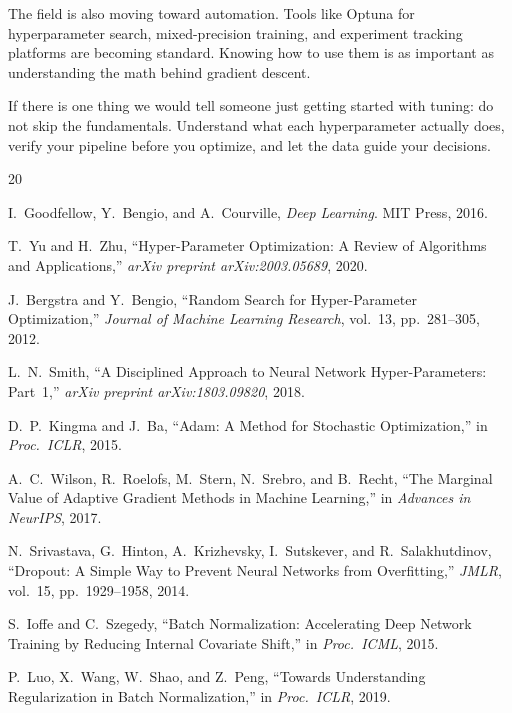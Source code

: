 \documentclass[12pt, letterpaper]{article}
\begin{document}
The field is also moving toward automation. Tools like Optuna for hyperparameter search, mixed-precision training, and experiment tracking platforms are becoming standard. Knowing how to use them is as important as understanding the math behind gradient descent.

If there is one thing we would tell someone just getting started with tuning: do not skip the fundamentals. Understand what each hyperparameter actually does, verify your pipeline before you optimize, and let the data guide your decisions.

\newpage
\begin{thebibliography}{20}

I.\ Goodfellow, Y.\ Bengio, and A.\ Courville,
\textit{Deep Learning}.
MIT Press, 2016.

T.\ Yu and H.\ Zhu,
``Hyper-Parameter Optimization: A Review of Algorithms and Applications,''
\textit{arXiv preprint arXiv:2003.05689}, 2020.

J.\ Bergstra and Y.\ Bengio,
``Random Search for Hyper-Parameter Optimization,''
\textit{Journal of Machine Learning Research}, vol.~13, pp.~281--305, 2012.

L.~N.\ Smith,
``A Disciplined Approach to Neural Network Hyper-Parameters: Part~1,''
\textit{arXiv preprint arXiv:1803.09820}, 2018.

D.~P.\ Kingma and J.\ Ba,
``Adam: A Method for Stochastic Optimization,''
in \textit{Proc.\ ICLR}, 2015.

A.~C.\ Wilson, R.\ Roelofs, M.\ Stern, N.\ Srebro, and B.\ Recht,
``The Marginal Value of Adaptive Gradient Methods in Machine Learning,''
in \textit{Advances in NeurIPS}, 2017.

N.\ Srivastava, G.\ Hinton, A.\ Krizhevsky, I.\ Sutskever, and R.\ Salakhutdinov,
``Dropout: A Simple Way to Prevent Neural Networks from Overfitting,''
\textit{JMLR}, vol.~15, pp.~1929--1958, 2014.

S.\ Ioffe and C.\ Szegedy,
``Batch Normalization: Accelerating Deep Network Training by Reducing Internal Covariate Shift,''
in \textit{Proc.\ ICML}, 2015.

P.\ Luo, X.\ Wang, W.\ Shao, and Z.\ Peng,
``Towards Understanding Regularization in Batch Normalization,''
in \textit{Proc.\ ICLR}, 2019.


\end{thebibliography}
\end{document}
